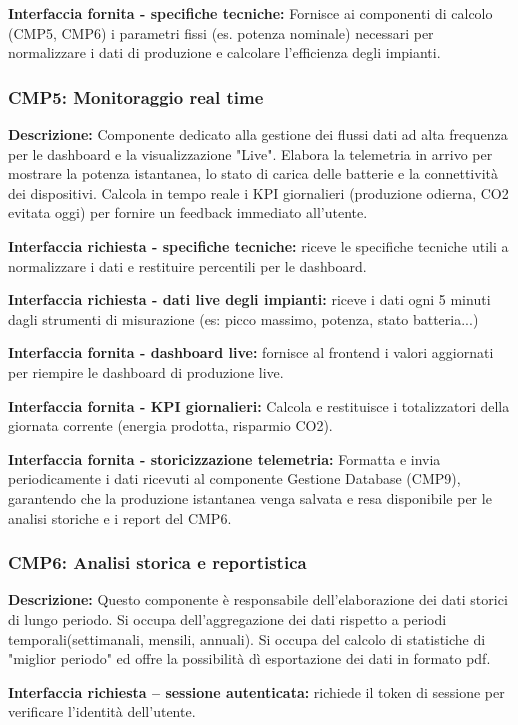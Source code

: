 \textbf{Interfaccia fornita - specifiche tecniche:}
Fornisce ai componenti di calcolo (CMP5, CMP6) i parametri fissi (es. potenza nominale)
necessari per normalizzare i dati di produzione e calcolare l'efficienza degli impianti.

\subsubsection*{CMP5: Monitoraggio real time}
\textbf{Descrizione: }Componente dedicato alla gestione dei flussi dati ad alta frequenza
per le dashboard e la visualizzazione "Live". Elabora la telemetria in arrivo per mostrare
la potenza istantanea, lo stato di carica delle batterie e la connettività dei dispositivi.
Calcola in tempo reale i KPI giornalieri (produzione odierna, CO2 evitata oggi) per fornire un
feedback immediato all'utente.

\textbf{Interfaccia richiesta - specifiche tecniche:}
riceve le specifiche tecniche utili a normalizzare i dati e restituire percentili per le dashboard.

\textbf{Interfaccia richiesta - dati live degli impianti:}
riceve i dati ogni 5 minuti dagli strumenti di misurazione (es: picco massimo, potenza, stato batteria...)

\textbf{Interfaccia fornita - dashboard live: }
fornisce al frontend i valori aggiornati per riempire le dashboard di produzione live.

\textbf{Interfaccia fornita - KPI giornalieri:}
Calcola e restituisce i totalizzatori della giornata corrente (energia prodotta, risparmio CO2).

\textbf{Interfaccia fornita - storicizzazione telemetria:}
Formatta e invia periodicamente i dati ricevuti al componente Gestione Database (CMP9),
garantendo che la produzione istantanea venga salvata e resa disponibile per le analisi
storiche e i report del CMP6.

\subsubsection*{CMP6: Analisi storica e reportistica}
\textbf{Descrizione: }Questo componente è responsabile dell'elaborazione dei dati storici di
lungo periodo. Si occupa dell'aggregazione dei dati rispetto a periodi temporali(settimanali,
mensili, annuali). Si occupa del calcolo di statistiche di "miglior periodo" ed offre la possibilità dì
esportazione dei dati in formato pdf.

\textbf{Interfaccia richiesta – sessione autenticata:}
richiede il token di sessione per verificare l'identità dell'utente.

